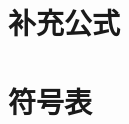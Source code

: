 \documentclass[
    lang=cn,
    color=blue,
    mode=fancy,
    thmcnt=section,
    scheme=chinese
]{elegantbook}
\begin{document}

\appendix


\chapter{补充公式}



\chapter{符号表}




\backmatter

%
% 
% 


\end{document}
